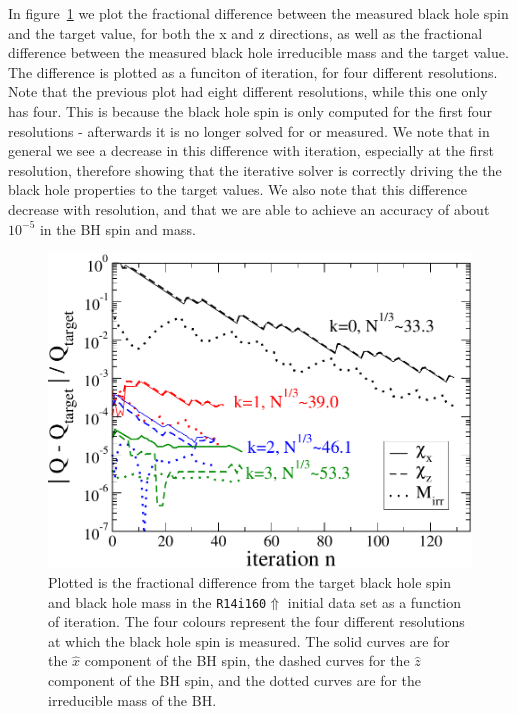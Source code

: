In figure~\ref{Fig:BHSpinConv} we plot the fractional difference between the measured black hole spin and the target value, for both the x and z directions, as well as the fractional difference between
the measured black hole irreducible mass and the target value. The difference is plotted as a funciton of iteration, for four different resolutions. Note that the previous plot had eight different resolutions, while this one only has four. This is because the black hole spin is only computed for the first four resolutions - afterwards it is no longer solved for or measured. We note that in general we see a decrease in this difference with iteration, especially at the first resolution, therefore showing that the iterative solver is correctly driving the the black hole properties to the target values.
We also note that this difference decrease with resolution, and that we are able to achieve an accuracy of about $10^{-5}$ in the BH spin and mass.

\begin{figure}
\includegraphics[width=0.95\columnwidth]{chap4/BHSpinConv}
\caption[Convergence of black hole spin and mass.]{\label{Fig:BHSpinConv} Plotted is the fractional difference from the target black hole spin and black hole mass in the {\tt R14i160$\Uparrow$} initial data set as a function of iteration. The four colours represent 
the four different resolutions at which the black hole spin is measured. The solid curves are for the $\hat{x}$ component of the BH spin, the dashed curves for the $\hat{z}$ component of the BH spin, and
the dotted curves are for the irreducible mass of the BH.}
\end{figure}

